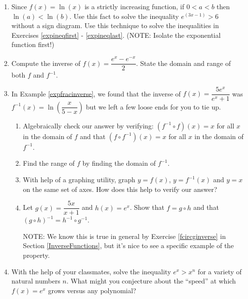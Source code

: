 \begin{enumerate}
\setcounter{enumi}{\value{HW}}

\item \label{onetoonelogexercise} Since $f(x) = \ln(x)$ is a strictly increasing function, if $0 < a < b$ then $\ln(a) < \ln(b)$.  Use this fact to solve the inequality $e^{(3x - 1)} > 6$ without a sign diagram. Use this technique to solve the inequalities in Exercises \ref{expineqfirst} - \ref{expineqlast}. (NOTE:  Isolate the exponential function first!)

\item \label{hyperbolicsine} Compute the inverse of $f(x) = \dfrac{e^{x} - e^{-x}}{2}$.  State the domain and range of both $f$ and $f^{-1}$. 

\item \label{checkingexpfracinverse} In Example \ref{expfracinverse}, we found that the inverse of $f(x) = \dfrac{5e^{x}}{e^{x}+1}$ was $f^{-1}(x) = \ln\left(\dfrac{x}{5-x}\right)$ but we left a few loose ends for you to tie up.  

\begin{enumerate}

\item Algebraically check our answer by verifying: $\left(f^{-1} \circ f\right)(x) = x$ for all $x$ in the domain of $f$ and that $\left(f \circ f^{-1}\right)(x) = x$ for all $x$ in the domain of $f^{-1}$.

\item Find the range of $f$ by finding the domain of $f^{-1}$.

\item With help of a graphing utility, graph $y = f(x)$,  $y = f^{-1}(x)$ and $y = x$ on the same set of axes.  How does this help to verify our answer?

\item Let $g(x) = \dfrac{5x}{x+1}$ and $h(x) = e^{x}$.  Show that $f = g \circ h$ and that $(g \circ h)^{-1} = h^{-1} \circ g^{-1}$. 

NOTE:  We know this is true in general by Exercise \ref{fcircginverse} in Section \ref{InverseFunctions}, but it's nice to see a specific example of the property.

\end{enumerate}

\item With the help of your classmates, solve the inequality $e^{x} > x^{n}$ for a variety of natural numbers $n$.  What might you conjecture about the ``speed'' at which $f(x) = e^{x}$ grows versus any polynomial?

\end{enumerate}

